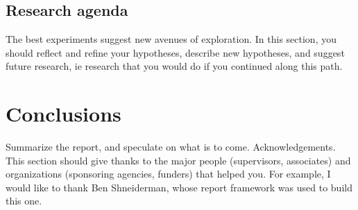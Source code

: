 \subsection{Research agenda}
The best experiments suggest new avenues of exploration. In this section, you should reflect and refine your hypotheses, describe new hypotheses, and suggest future research, ie research that you would do if you continued along this path.
\section{Conclusions}
Summarize the report, and speculate on what is to come.
Acknowledgements. This section should give thanks to the major people (supervisors, associates) and organizations (sponsoring agencies, funders) that helped you. For example, I would like to thank Ben Shneiderman, whose report framework was used to build this one.